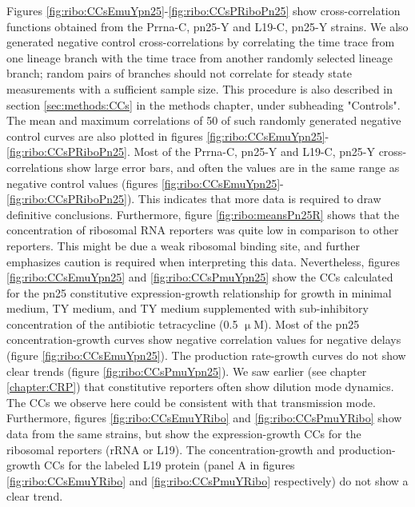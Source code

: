Figures \ref{fig:ribo:CCsEmuYpn25}-\ref{fig:ribo:CCsPRiboPn25} show cross-correlation functions obtained from the Prrna-C, pn25-Y and L19-C, pn25-Y strains.
%
We also generated negative control cross-correlations 
by correlating the time trace from one lineage branch with the time trace from another randomly selected lineage branch; 
random pairs of branches should not correlate for steady state measurements with a sufficient sample size.
%
This procedure is also described in section \ref{sec:methods:CCs} in the methods chapter, under subheading "Controls". 
%
The mean and maximum correlations of 50 of such randomly generated negative control curves are also plotted in figures \ref{fig:ribo:CCsEmuYpn25}-\ref{fig:ribo:CCsPRiboPn25}.
%
Most of the Prrna-C, pn25-Y and L19-C, pn25-Y cross-correlations show 
large error bars, and often the values are in the same range as negative control values (figures \ref{fig:ribo:CCsEmuYpn25}-\ref{fig:ribo:CCsPRiboPn25}). 
%
This indicates 
that more data is required to draw definitive conclusions.
Furthermore, figure \ref{fig:ribo:meansPn25R} shows that the concentration of ribosomal RNA reporters was quite low in comparison to other reporters. This might be due a weak ribosomal binding site, 
and further emphasizes caution is required when interpreting this data.
%
Nevertheless, figures \ref{fig:ribo:CCsEmuYpn25} and \ref{fig:ribo:CCsPmuYpn25} show the CCs calculated for the pn25 constitutive expression-growth relationship for growth in minimal medium, TY medium, and TY medium supplemented with sub-inhibitory concentration of the antibiotic tetracycline (0.5 $\upmu$M).
%
Most of the pn25 concentration-growth curves show negative correlation values for negative delays (figure \ref{fig:ribo:CCsEmuYpn25}).
The production rate-growth curves do not show clear trends (figure \ref{fig:ribo:CCsPmuYpn25}).
We saw earlier (see chapter \ref{chapter:CRP}) that constitutive reporters often show dilution mode dynamics.
The CCs we observe here could be consistent with that transmission mode.
%
Furthermore, figures \ref{fig:ribo:CCsEmuYRibo} and \ref{fig:ribo:CCsPmuYRibo} show data from the same strains, but show the expression-growth CCs for the ribosomal reporters (rRNA or L19).
The concentration-growth and production-growth CCs for the labeled L19 protein (panel A in figures \ref{fig:ribo:CCsEmuYRibo} and \ref{fig:ribo:CCsPmuYRibo} respectively) do not show a clear trend.
